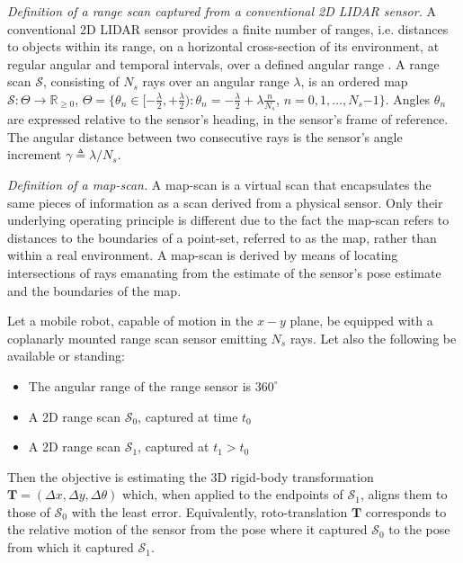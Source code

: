 \begin{definition}
  \label{def:definition_1}
  \textit{Definition of a range scan captured from a conventional 2D LIDAR
  sensor.} A conventional 2D LIDAR sensor provides a finite number of ranges,
  i.e. distances to objects within its range, on a horizontal cross-section of
  its environment, at regular angular and temporal intervals, over a defined
  angular range \cite{Cooper2018b}. A range scan $\mathcal{S}$, consisting
  of $N_s$ rays over an angular range $\lambda$, is an ordered map
  $\mathcal{S} : \Theta \rightarrow \mathbb{R}_{\geq 0}$, $\Theta =
  \{\theta_n \in [-\frac{\lambda}{2}, +\frac{\lambda}{2}) : \theta_n =
  -\frac{\lambda}{2} + \lambda \frac{n}{N_s}$, $n = 0,1,\dots, N_s$$-$$1$$\}$.
  Angles $\theta_n$ are expressed relative to the sensor's heading, in the
  sensor's frame of reference. The angular distance between two consecutive
  rays is the sensor's angle increment $\gamma \triangleq \lambda/N_s$.
\end{definition}

\begin{definition}
  \label{def:definition_3}
  \textit{Definition of a map-scan.}
  A map-scan is a virtual scan that encapsulates the same pieces of information
  as a scan derived from a physical sensor. Only their underlying operating
  principle is different due to the fact the map-scan refers to distances to
  the boundaries of a point-set, referred to as the map, rather than within a
  real environment. A map-scan is derived by means of locating intersections of
  rays emanating from the estimate of the sensor's pose estimate and the
  boundaries of the map.
\end{definition}

\begin{problem}
  \label{prob:the_problem}
  Let a mobile robot, capable of motion in the $x-y$ plane, be equipped with a
  coplanarly mounted range scan sensor emitting $N_s$ rays. Let
  also the following be available or standing:
  \begin{itemize}
    \item The angular range of the range sensor is $360^\circ$
    \item A 2D range scan $\mathcal{S}_0$, captured at time $t_0$
    \item A 2D range scan $\mathcal{S}_1$, captured at $t_1 > t_0$
  \end{itemize}
\end{problem}
Then the objective is estimating the 3D rigid-body transformation
$\bm{T} = (\Delta x, \Delta y, \Delta \theta)$ which, when applied to the
endpoints of $\mathcal{S}_1$, aligns them to those of $\mathcal{S}_0$ with the
least error. Equivalently, roto-translation $\bm{T}$ corresponds to the
relative motion of the sensor from the pose where it captured $\mathcal{S}_0$
to the pose from which it captured $\mathcal{S}_1$.
